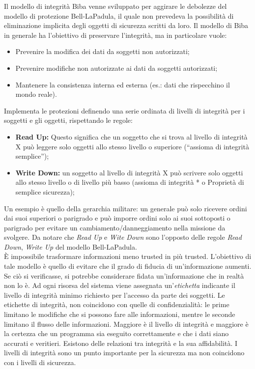 Il modello di integrità Biba venne sviluppato per aggirare le debolezze del
modello di protezione
Bell-LaPadula, il quale non prevedeva la possibilità di eliminazione implicita
degli oggetti di
sicurezza scritti da loro.
Il modello di Biba in generale ha l'obiettivo di preservare l'integrità, ma in
particolare vuole:

\begin{itemize}
      \item Prevenire la modifica dei dati da soggetti non autorizzati;
      \item Prevenire modifiche non autorizzate ai dati da soggetti autorizzati;
      \item Mantenere la consistenza interna ed esterna (es.: dati che
            rispecchino il mondo reale).
\end{itemize}

Implementa le protezioni definendo una serie ordinata di livelli di integrità
per i soggetti e gli
oggetti, rispettando le regole:

\begin{itemize}
      \item \textbf{Read Up:} Questo significa che
            un soggetto che si trova al livello di integrità X può leggere
            solo oggetti allo stesso livello o
            superiore (“assioma di integrità semplice”);
      \item \textbf{Write Down:} un soggetto al livello di integrità X può
            scrivere solo oggetti allo stesso livello
            o di livello più basso (assioma di integrità * o Proprietà di
            semplice sicurezza);
\end{itemize}
Un esempio è quello della gerarchia militare: un generale può solo ricevere
ordini dai suoi superiori o parigrado e può imporre ordini solo ai suoi
sottoposti o parigrado per evitare un cambiamento/danneggiamento
nella missione da svolgere.
Da notare che \textit{Read Up} e \textit{Wite Down} sono l'opposto delle regole
\textit{Read Down}, \textit{Write Up} del modello Bell-LaPadula.\\

È impossibile trasformare informazioni meno trusted in più trusted.
L'obiettivo di tale modello è quello di evitare che il grado di fiducia di
un'informazione aumenti. Se ciò
si verificasse, si potrebbe considerare fidata un'informazione che in realtà
non lo è.
Ad ogni risorsa del sistema viene assegnata un'\textit{etichetta} indicante
il livello di integrità minimo
richiesto per l'accesso da parte dei soggetti. Le etichette di integrità,
non coincidono con quelle di
confidenzialità: le prime limitano le modifiche che si possono fare alle
informazioni, mentre le
seconde limitano il flusso delle informazioni. Maggiore è il livello di
integrità e maggiore è la
certezza che un programma sia eseguito correttamente e che i dati siano accurati
e veritieri.
Esistono delle relazioni tra integrità e la sua affidabilità. I livelli di
integrità sono un punto
importante per la sicurezza ma non coincidono con i livelli di sicurezza.\\

